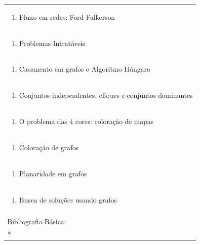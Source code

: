 \documentclass[11pt]{article}
\begin{document}
\begin{center}
\begin{longtable}{|p{4cm}|p{4cm}|p{4cm}|p{4cm}|}
\multicolumn{4}{|p{\dimexpr 16cm + 6\tabcolsep\relax}|}{\begin{enumerate}[start=11]\item Fluxo em redes: Ford-Fulkerson\end{enumerate}}\\
\multicolumn{4}{|p{\dimexpr 16cm + 6\tabcolsep\relax}|}{\begin{enumerate}[start=12]\item Problemas Intratáveis\end{enumerate}}\\
\multicolumn{4}{|p{\dimexpr 16cm + 6\tabcolsep\relax}|}{\begin{enumerate}[start=13]\item Casamento em grafos e Algoritmo Húngaro\end{enumerate}}\\
\multicolumn{4}{|p{\dimexpr 16cm + 6\tabcolsep\relax}|}{\begin{enumerate}[start=14]\item Conjuntos independentes, cliques e conjuntos dominantes\end{enumerate}}\\
\multicolumn{4}{|p{\dimexpr 16cm + 6\tabcolsep\relax}|}{\begin{enumerate}[start=15]\item O problema das 4 cores: coloração de mapas\end{enumerate}}\\
\multicolumn{4}{|p{\dimexpr 16cm + 6\tabcolsep\relax}|}{\begin{enumerate}[start=16]\item Coloração de grafos\end{enumerate}}\\
\multicolumn{4}{|p{\dimexpr 16cm + 6\tabcolsep\relax}|}{\begin{enumerate}[start=17]\item Planaridade em grafos\end{enumerate}}\\
\multicolumn{4}{|p{\dimexpr 16cm + 6\tabcolsep\relax}|}{\begin{enumerate}[start=18]\item Busca de soluções usando grafos\end{enumerate}}\\
\multicolumn{4}{|p{\dimexpr 16cm + 6\tabcolsep\relax}|}{}\\
\hline
\multicolumn{4}{|p{16cm}|}{Bibliografia Básica:}\\*

\end{longtable}
\end{center}
\end{document}
